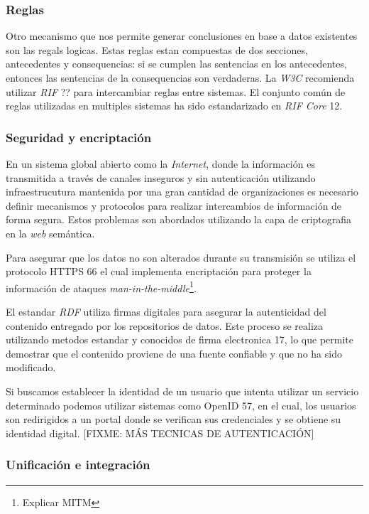 \subsubsection{Reglas}

Otro mecanismo que nos permite generar conclusiones en base a datos existentes
son las regals logicas. Estas reglas estan compuestas de dos secciones,
antecedentes y consequencias: si se cumplen las sentencias en los antecedentes,
entonces las sentencias de la consequencias son verdaderas. La \textit{W3C}
recomienda utilizar \textit{RIF} ?? para intercambiar reglas entre sistemas. El
conjunto común de reglas utilizadas en multiples sistemas ha sido estandarizado
en \textit{RIF Core} 12.

\subsubsection{Seguridad y encriptación}

En un sistema global abierto como la \textit{Internet}, donde la información es
transmitida a través de canales inseguros y sin autenticación utilizando
infraestrucutura mantenida por una gran cantidad de organizaciones es necesario
definir mecanismos y protocolos para realizar intercambios de información de
forma segura. Estos problemas son abordados utilizando la capa de criptografia
en la \textit{web} semántica.

Para asegurar que los datos no son alterados durante su transmisión se utiliza
el protocolo HTTPS 66 el cual implementa encriptación para proteger la
información de ataques \textit{man-in-the-middle}\footnote{Explicar MITM}.

El estandar \textit{RDF} utiliza firmas digitales para asegurar la autenticidad
del contenido entregado por los repositorios de datos. Este proceso se realiza
utilizando metodos estandar y conocidos de firma electronica 17, lo que permite
demostrar que el contenido proviene de una fuente confiable y que no ha sido
modificado.

Si buscamos establecer la identidad de un usuario que intenta utilizar un
servicio determinado podemos utilizar sistemas como OpenID 57, en el cual, los
usuarios son redirigidos a un portal donde se verifican sus credenciales y se
obtiene su identidad digital. [FIXME: MÁS TECNICAS DE AUTENTICACIÓN]

\subsubsection{Unificación e integración}

